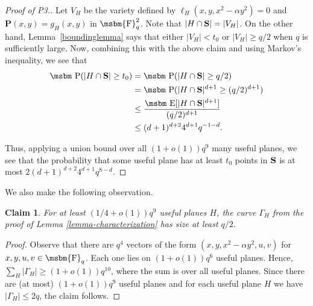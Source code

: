 \documentclass[12pt]{article}
\newtheorem{claim}[theorem]{Claim}
\newcommand{\FF}{\mbox{\msbm{F}}}
\newcommand{\PP}{\mbox{\msbm P}}
\newcommand{\EE}{\mbox{\msbm E}}
\begin{document}
\begin{proof}[Proof of P3.]
Let $V_H$ be the variety defined by  $\ell_H(x,y, x^2 - \alpha y^2) = 0$ and $\textbf{P}(x, y) = g_H(x, y)$ in $\FF_q^2$. Note that $|H\cap \bold{S}|=|V_H|$. On the other hand, Lemma~\ref{boundinglemma} says that either $|V_H| < t_0$ or $|V_H| \geq q/2$ when $q$ is sufficiently large.  
Now, combining this with the above claim and using Markov's inequality, we see that \begin{align*}
    \PP(|H \cap \bold{S}| \geq t_0) &= \PP(|H \cap \bold{S}| \geq q/2)\\ &= \PP(|H \cap \bold{S}|^{ d + 1} \geq (q/2)^{ d + 1})\\ &\leq \frac{\EE[|H \cap \bold{S}|^{ d + 1}]}{(q/2)^{ d + 1}}\\&\leq (d + 1)^{d + 2} 4^{ d + 1} q^{-1 - d}.
\end{align*}

Thus, applying a union bound over all $(1 + o(1))q^9$ many useful planes, we see that the probability that some useful plane has at least $t_0$ points in $\bold{S}$ is at most $2(d + 1)^{d+2}4^{d + 1} q^{8 - d}.$
\end{proof}

We also make the following observation. 
\begin{claim}\label{countonusefulplanes}
For at least $(1/4+o(1))q^9$ useful planes $H$, the curve $\Gamma_H$ from the proof of Lemma \ref{lemma-characterization} has size at least $q/2$. 
\end{claim}
\begin{proof}

Observe that there are $q^4$ vectors of the form $(x, y, x^2 - \alpha y^2, u, v)$ for $x, y, u, v \in \FF_q$. Each one lies on $(1 + o(1))q^6$ useful planes. Hence, $\sum_{H} |\Gamma_H|\geq (1+o(1))q^{10}$, where the sum is over all useful planes. Since there are (at most) $(1+o(1))q^9$ useful planes and for each useful plane $H$ we have $|\Gamma_H|\leq 2q$, the claim follows.   
\end{proof}
\end{document}
